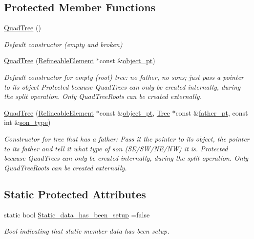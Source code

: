 \subsection*{Protected Member Functions}
\begin{DoxyCompactItemize}
\item 
\hyperlink{classoomph_1_1QuadTree_aa56c6ca60d708eee10217cb341399fe3}{Quad\+Tree} ()
\begin{DoxyCompactList}\small\item\em Default constructor (empty and broken) \end{DoxyCompactList}\item 
\hyperlink{classoomph_1_1QuadTree_a41f19525579fbf151a0e73eefca43a0b}{Quad\+Tree} (\hyperlink{classoomph_1_1RefineableElement}{Refineable\+Element} $\ast$const \&\hyperlink{classoomph_1_1Tree_a2f2eeb0f1dd161f696cccc652974ff4c}{object\+\_\+pt})
\begin{DoxyCompactList}\small\item\em Default constructor for empty (root) tree\+: no father, no sons; just pass a pointer to its object Protected because Quad\+Trees can only be created internally, during the split operation. Only Quad\+Tree\+Roots can be created externally. \end{DoxyCompactList}\item 
\hyperlink{classoomph_1_1QuadTree_aef8906aed3a32ba3f7c1723d8dc26015}{Quad\+Tree} (\hyperlink{classoomph_1_1RefineableElement}{Refineable\+Element} $\ast$const \&\hyperlink{classoomph_1_1Tree_a2f2eeb0f1dd161f696cccc652974ff4c}{object\+\_\+pt}, \hyperlink{classoomph_1_1Tree}{Tree} $\ast$const \&\hyperlink{classoomph_1_1Tree_a5f8444ddeda272b70669b8bbe929708a}{father\+\_\+pt}, const int \&\hyperlink{classoomph_1_1Tree_a7537f8fe7c896d2220eb2da03567b34d}{son\+\_\+type})
\begin{DoxyCompactList}\small\item\em Constructor for tree that has a father\+: Pass it the pointer to its object, the pointer to its father and tell it what type of son (S\+E/\+S\+W/\+N\+E/\+NW) it is. Protected because Quad\+Trees can only be created internally, during the split operation. Only Quad\+Tree\+Roots can be created externally. \end{DoxyCompactList}\end{DoxyCompactItemize}
\subsection*{Static Protected Attributes}
\begin{DoxyCompactItemize}
\item 
static bool \hyperlink{classoomph_1_1QuadTree_af41a83bfcd8c5eb535f7d2828ff712d1}{Static\+\_\+data\+\_\+has\+\_\+been\+\_\+setup} =false
\begin{DoxyCompactList}\small\item\em Bool indicating that static member data has been setup. \end{DoxyCompactList}\end{DoxyCompactItemize}
